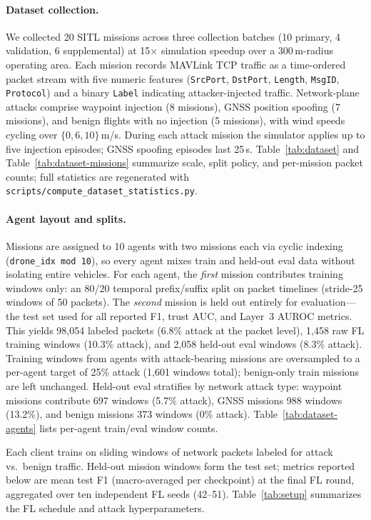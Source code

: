 \paragraph{Dataset collection.}
We collected 20 SITL missions across three collection batches (10 primary, 4 validation, 6 supplemental) at 15$\times$ simulation speedup over a 300\,m-radius operating area.
Each mission records MAVLink TCP traffic as a time-ordered packet stream with five numeric features (\texttt{SrcPort}, \texttt{DstPort}, \texttt{Length}, \texttt{MsgID}, \texttt{Protocol}) and a binary \texttt{Label} indicating attacker-injected traffic.
Network-plane attacks comprise waypoint injection (8 missions), GNSS position spoofing (7 missions), and benign flights with no injection (5 missions), with wind speeds cycling over $\{0, 6, 10\}$\,m/s.
During each attack mission the simulator applies up to five injection episodes; GNSS spoofing episodes last 25\,s.
Table~\ref{tab:dataset} and Table~\ref{tab:dataset-missions} summarize scale, split policy, and per-mission packet counts; full statistics are regenerated with \texttt{scripts/compute\_dataset\_statistics.py}.

\paragraph{Agent layout and splits.}
Missions are assigned to 10 agents with two missions each via cyclic indexing (\texttt{drone\_idx mod 10}), so every agent mixes train and held-out eval data without isolating entire vehicles.
For each agent, the \emph{first} mission contributes training windows only: an 80/20 temporal prefix/suffix split on packet timelines (stride-25 windows of 50 packets).
The \emph{second} mission is held out entirely for evaluation---the test set used for all reported F1, trust AUC, and Layer~3 AUROC metrics.
This yields 98{,}054 labeled packets (6.8\% attack at the packet level), 1{,}458 raw FL training windows (10.3\% attack), and 2{,}058 held-out eval windows (8.3\% attack).
Training windows from agents with attack-bearing missions are oversampled to a per-agent target of 25\% attack (1{,}601 windows total); benign-only train missions are left unchanged.
Held-out eval stratifies by network attack type: waypoint missions contribute 697 windows (5.7\% attack), GNSS missions 988 windows (13.2\%), and benign missions 373 windows (0\% attack).
Table~\ref{tab:dataset-agents} lists per-agent train/eval window counts.

Each client trains on sliding windows of network packets labeled for attack vs.\ benign traffic.
Held-out mission windows form the test set; metrics reported below are mean test F1 (macro-averaged per checkpoint) at the final FL round, aggregated over ten independent FL seeds (42--51).
Table~\ref{tab:setup} summarizes the FL schedule and attack hyperparameters.

